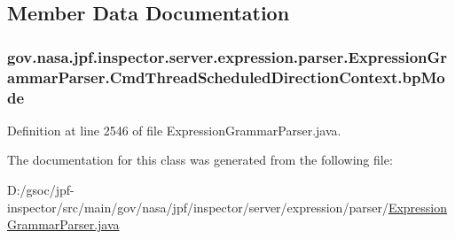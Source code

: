 \subsection{Member Data Documentation}
\subsubsection[{\texorpdfstring{bp\+Mode}{bpMode}}]{ gov.\+nasa.\+jpf.\+inspector.\+server.\+expression.\+parser.\+Expression\+Grammar\+Parser.\+Cmd\+Thread\+Scheduled\+Direction\+Context.\+bp\+Mode}\hypertarget{classgov_1_1nasa_1_1jpf_1_1inspector_1_1server_1_1expression_1_1parser_1_1_expression_grammar_pa3ae49d5d83c380526042a5aff91ee0a2_a6b918809e1604f546ba4cd87f491b1ec}{}\label{classgov_1_1nasa_1_1jpf_1_1inspector_1_1server_1_1expression_1_1parser_1_1_expression_grammar_pa3ae49d5d83c380526042a5aff91ee0a2_a6b918809e1604f546ba4cd87f491b1ec}


Definition at line 2546 of file Expression\+Grammar\+Parser.\+java.



The documentation for this class was generated from the following file\+:\begin{DoxyCompactItemize}
\item 
D\+:/gsoc/jpf-\/inspector/src/main/gov/nasa/jpf/inspector/server/expression/parser/\hyperlink{_expression_grammar_parser_8java}{Expression\+Grammar\+Parser.\+java}\end{DoxyCompactItemize}
